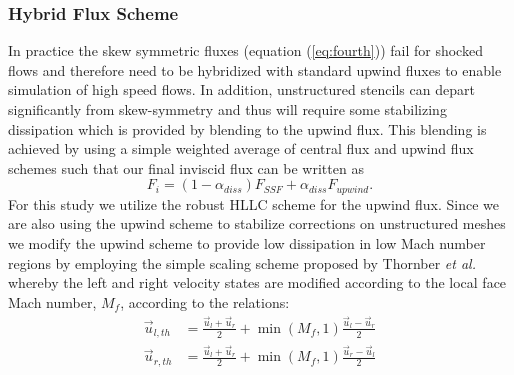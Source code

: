 \subsubsection{Hybrid Flux Scheme}

In practice the skew symmetric fluxes (equation (\ref{eq:fourth}))
fail for shocked flows and therefore need to be hybridized with standard
upwind fluxes to enable simulation of high speed flows.  In addition,
unstructured stencils can depart significantly from skew-symmetry and
thus will require some stabilizing dissipation which is provided by
blending to the upwind flux. This blending is achieved by using a
simple weighted average of central flux and upwind flux schemes such
that our final inviscid flux can be written as
\begin{equation}
F_i = (1-\alpha_{diss})F_{SSF} + \alpha_{diss} F_{upwind}.
\end{equation}
For this study we utilize the robust HLLC scheme\cite{Torro.1994} for
the upwind flux.  Since we are also using the upwind scheme to
stabilize corrections on unstructured meshes we modify the 
upwind scheme to provide low dissipation in low Mach number regions by
employing the simple scaling scheme proposed by Thornber {\it et
  al.}\cite{Thornber.2008} whereby the left and right velocity states
are modified according to the local face Mach number, $M_{f}$,
according to the relations:
\begin{equation}
\begin{aligned}
\vec{u}_{l,th} &= \frac{\vec{u}_l + \vec{u}_r}{2} + \min(M_{f},1) \frac{\vec{u}_l-\vec{u}_r}{2}\\
\vec{u}_{r,th} &= \frac{\vec{u}_l + \vec{u}_r}{2} + \min(M_{f},1) \frac{\vec{u}_r-\vec{u}_l}{2}\\
\end{aligned}
\end{equation}

